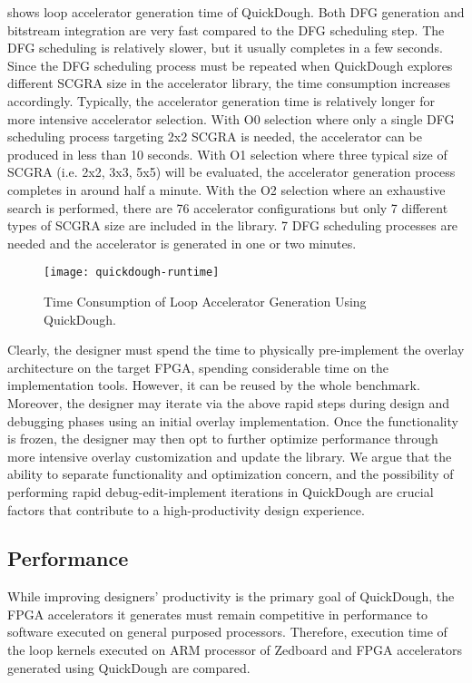  shows loop accelerator generation time of QuickDough.
Both DFG generation and bitstream integration are very fast compared to the DFG scheduling step. The DFG
scheduling is relatively slower, but it usually completes in a few seconds.
Since the DFG scheduling process must be repeated when QuickDough explores different SCGRA size in
the accelerator library, the time consumption increases accordingly. Typically, the accelerator
generation time is relatively longer for more intensive accelerator selection. With O0 selection
where only a single DFG scheduling process targeting 2x2 SCGRA is needed, the accelerator can be
produced in less than 10 seconds. With O1 selection where three typical size of SCGRA (i.e. 2x2,
3x3, 5x5) will be evaluated, the accelerator
generation process completes in around half a minute. With the O2 selection where an exhaustive
search is performed, there are 76 accelerator configurations but only 7 different types of SCGRA
size are included in the library. 7 DFG scheduling processes are needed and the accelerator is
generated in one or two minutes.

\begin{figure}
\centering
\texttt{[image: quickdough-runtime]}
\caption{Time Consumption of Loop Accelerator Generation Using QuickDough.}
\label{fig:SCGRA-Overlay-Compilation-Time}
\end{figure}

Clearly, the designer must spend the time to physically pre-implement 
the overlay architecture on the target FPGA, spending considerable 
time on the implementation tools. However, it can be reused by the whole benchmark.
Moreover, the designer may iterate via the above rapid steps during 
design and debugging phases using an initial overlay implementation.
Once the functionality is frozen, the designer may then opt to further optimize 
performance through more intensive overlay customization and update the library. 
We argue that the ability to separate functionality and optimization 
concern, and the possibility of performing rapid debug-edit-implement 
iterations in QuickDough are crucial factors that contribute to a high-productivity 
design experience.

\subsection{Performance} \label{subsec:acc-perf}
While improving designers' productivity is the primary goal of QuickDough, the FPGA accelerators it
generates must remain competitive in performance to software executed on general 
purposed processors. Therefore, execution time of the loop kernels executed on ARM 
processor of Zedboard and FPGA accelerators generated using QuickDough are compared.

